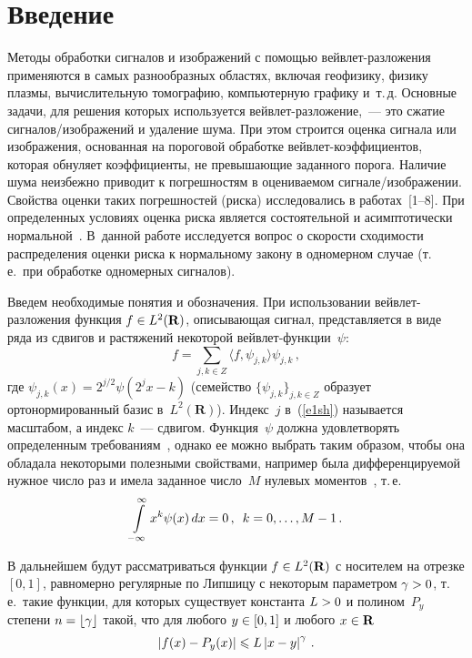       \begin{multicols}{2}

            \label{st\stat}


\section{Введение}

Методы обработки сигналов и изображений с помощью вейвлет-разложения применяются в 
самых разнообразных областях, включая геофизику, физику плазмы, вычислительную 
томографию, компьютерную графику и~т.\,д. Основные задачи, для решения которых 
используется вейвлет-раз\-ло\-же\-ние,~--- это сжатие сигналов/изображений и удаление 
шума. При этом строится оценка сигнала или изображения, основанная на пороговой 
обработке вейвлет-коэффициентов, которая обнуляет коэффициенты, не превышающие 
заданного порога. Наличие шума неизбежно приводит к погрешностям в оцениваемом 
сигнале/изображении. Свойства оценки таких погрешностей (риска) исследовались 
в работах~[1--8]. При определенных условиях оценка риска является состоятельной 
и асимптотически нормальной~\cite{7sh}. В~данной работе исследуется вопрос о скорости 
сходимости распределения оценки риска к нормальному закону в одномерном случае (т.\,е.\ 
при обработке одномерных сигналов).

Введем необходимые понятия и обозначения. При использовании вейвлет-разложения функция 
$f\hm\in L^2(\mathbf{R})$, описывающая сигнал, представляется в виде ряда из 
сдвигов и растяжений некоторой вейв\-лет-функции~$\psi$:
\begin{equation}
f=\sum_{j,k\in Z}\langle f,\psi_{j,k}\rangle\psi_{j,k}\,,\label{e1sh}
\end{equation}
где $\psi_{j,k}(x)=2^{j/2}\psi(2^jx-k)$ (семейство $\{\psi_{j,k}\}_{j,k\in Z}$ 
образует ортонормированный базис в~$L^2(\mathbf{R})$). Индекс~$j$ в~(\ref{e1sh}) 
называется масштабом, а индекс $k$~--- сдвигом. Функция~$\psi$ должна удовлетворять 
определенным требованиям~\cite{9sh}, однако ее можно выбрать таким образом, чтобы 
она обладала некоторыми полезными свойствами, например была дифференцируемой нужное 
число раз и имела заданное число~$M$ нулевых моментов~\cite{9sh}, т.\,е.\
$$
\int\limits_{-\infty}^{\infty}x^k\psi(x)\,dx=0\,,\enskip k=0,\ldots,M-1\,.
$$

В дальнейшем будут рассматриваться функции $f\hm\in L^2(\mathbf{R})$ с носителем на 
отрезке $[0,1]$, равномерно регулярные по Липшицу с некоторым параметром $\gamma\hm>0$, 
т.\,е.\ такие функции, для которых существует константа $L\hm>0$ и полином~$P_y$ 
степени $n\hm=\lfloor\gamma\rfloor$ такой, что для любого $y\hm\in[0,1]$ и любого 
$x\hm\in\mathbf{R}$
$$
\left\vert f(x)-P_y(x)\right\vert\leqslant L\left\vert x-y\right\vert^\gamma\,.
$$


\end{multicols}
